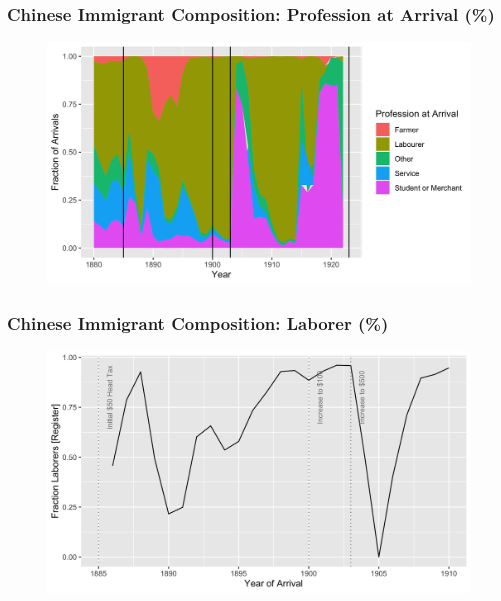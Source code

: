 \documentclass[pdf]{beamer}
\begin{document}
\begin{frame}[label = occ_pct]
	\frametitle{Chinese Immigrant Composition: Profession at Arrival (\%)}
    \centering
	\begin{figure}[H]
		\begin{center}
			\includegraphics[width=\textwidth]{../../figs/8aug23/occgrp_pct.png}
		\end{center}
	\end{figure}
    \hyperlink{occ_n}{}
\end{frame}

\begin{frame}[label = register_labor]
	\frametitle{Chinese Immigrant Composition: Laborer (\%)}
    \centering
	\begin{figure}[H]
		\begin{center}
			\includegraphics[width=\textwidth]{../../figs/8aug23/register_labor.png}
		\end{center}
	\end{figure}
    \hyperlink{register_regs}{}
\end{frame}
\end{document}
